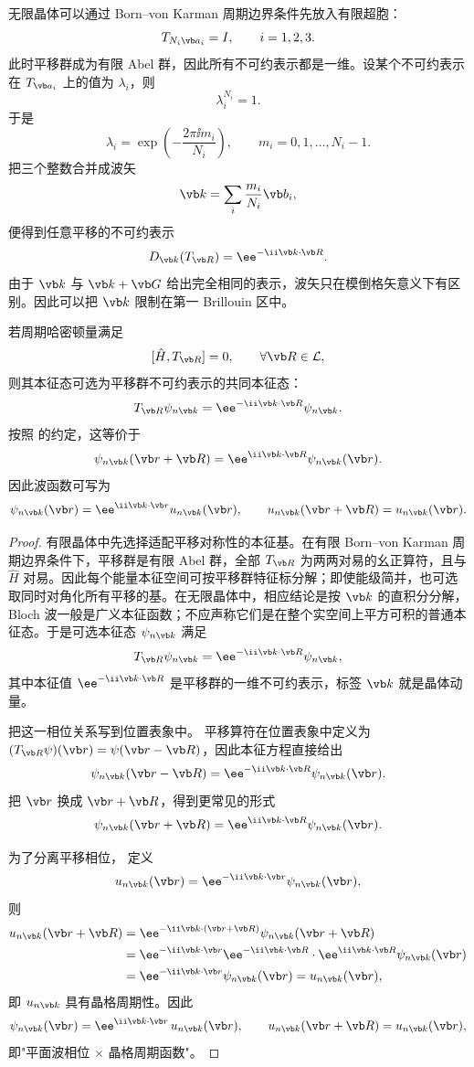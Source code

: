 无限晶体可以通过 Born--von Karman 周期边界条件先放入有限超胞：
\[
T_{N_i\vb a_i}=I,
\qquad i=1,2,3.
\]
此时平移群成为有限 Abel 群，因此所有不可约表示都是一维。设某个不可约表示在 $T_{\vb a_i}$ 上的值为 $\lambda_i$，则
\[
\lambda_i^{N_i}=1.
\]
于是
\[
\lambda_i=\exp\!\left(-\frac{2\pi\ii m_i}{N_i}\right),
\qquad m_i=0,1,\dots,N_i-1.
\]
把三个整数合并成波矢
\[
\vb k=\sum_i\frac{m_i}{N_i}\vb b_i,
\]
便得到任意平移的不可约表示
\[
D_{\vb k}(T_{\vb R})
=\ee^{-\ii\vb k\cdot\vb R}.
\label{eq:translation-irrep}
\]
由于 $\vb k$ 与 $\vb k+\vb G$ 给出完全相同的表示，波矢只在模倒格矢意义下有区别。因此可以把 $\vb k$ 限制在第一 Brillouin 区中。

\begin{theorem}[Bloch 定理]
若周期哈密顿量满足
\[
[\hat H,T_{\vb R}]=0,
\qquad \forall\vb R\in\mathcal L,
\]
则其本征态可选为平移群不可约表示的共同本征态：
\[
T_{\vb R}\psi_{n\vb k}
=\ee^{-\ii\vb k\cdot\vb R}\psi_{n\vb k}.
\label{eq:bloch-translation-eigenvalue}
\]
按照  的约定，这等价于
\[
\psi_{n\vb k}(\vb r+\vb R)
=\ee^{\ii\vb k\cdot\vb R}
\psi_{n\vb k}(\vb r).
\label{eq:bloch-boundary}
\]
因此波函数可写为
\[
\psi_{n\vb k}(\vb r)
=\ee^{\ii\vb k\cdot\vb r}
 u_{n\vb k}(\vb r),
\qquad
u_{n\vb k}(\vb r+\vb R)
=u_{n\vb k}(\vb r).
\label{eq:bloch-form}
\]
\label{thm:bloch}
\end{theorem}

\begin{proof}
有限晶体中先选择适配平移对称性的本征基。在有限 Born--von Karman 周期边界条件下，平移群是有限 Abel 群，全部 $T_{\vb R}$ 为两两对易的幺正算符，且与 $\hat H$ 对易。因此每个能量本征空间可按平移群特征标分解；即使能级简并，也可选取同时对角化所有平移的基。在无限晶体中，相应结论是按 $\vb k$ 的直积分分解，Bloch 波一般是广义本征函数；不应声称它们是在整个实空间上平方可积的普通本征态。于是可选本征态 $\psi_{n\vb k}$ 满足
\[
T_{\vb R}\psi_{n\vb k}=\ee^{-\ii\vb k\cdot\vb R}\psi_{n\vb k},
\]
其中本征值 $\ee^{-\ii\vb k\cdot\vb R}$ 是平移群的一维不可约表示，标签 $\vb k$ 就是晶体动量。

把这一相位关系写到位置表象中。
平移算符在位置表象中定义为 $(T_{\vb R}\psi)(\vb r)=\psi(\vb r-\vb R)$，因此本征方程直接给出
\[
\psi_{n\vb k}(\vb r-\vb R)=\ee^{-\ii\vb k\cdot\vb R}\psi_{n\vb k}(\vb r).
\]
把 $\vb r$ 换成 $\vb r+\vb R$，得到更常见的形式
\[
\psi_{n\vb k}(\vb r+\vb R)=\ee^{\ii\vb k\cdot\vb R}\psi_{n\vb k}(\vb r).
\]

为了分离平移相位，
定义
\[
u_{n\vb k}(\vb r)=\ee^{-\ii\vb k\cdot\vb r}\psi_{n\vb k}(\vb r),
\]
则
\begin{align*}
u_{n\vb k}(\vb r+\vb R)
&=\ee^{-\ii\vb k\cdot(\vb r+\vb R)}\psi_{n\vb k}(\vb r+\vb R)\\
&=\ee^{-\ii\vb k\cdot\vb r}\ee^{-\ii\vb k\cdot\vb R}\cdot\ee^{\ii\vb k\cdot\vb R}\psi_{n\vb k}(\vb r)\\
&=\ee^{-\ii\vb k\cdot\vb r}\psi_{n\vb k}(\vb r)=u_{n\vb k}(\vb r),
\end{align*}
即 $u_{n\vb k}$ 具有晶格周期性。因此
\[
\psi_{n\vb k}(\vb r)=\ee^{\ii\vb k\cdot\vb r}\,u_{n\vb k}(\vb r),
\qquad u_{n\vb k}(\vb r+\vb R)=u_{n\vb k}(\vb r),
\]
即"平面波相位 $\times$ 晶格周期函数"。
\end{proof}

